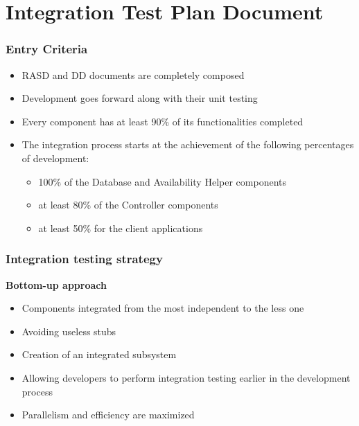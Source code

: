 \section{Integration Test Plan Document}

\begin{frame}
	\frametitle{Entry Criteria}
	\begin{itemize}
		\item RASD and DD documents are completely composed
		\item Development goes forward along with their unit testing
		\item Every component has at least 90\% of its functionalities completed
		\item The integration process starts at the achievement of the following percentages of development:
		\begin{itemize}
			\item 100\% of the Database and Availability Helper components
			\item at least 80\% of the Controller components
			\item at least 50\% for the client applications
		\end{itemize}
	\end{itemize}
\end{frame}

\begin{frame}
	\frametitle{Integration testing strategy}
	\qquad \textbf{Bottom-up approach}
	\begin{itemize}
		\item Components integrated from the most independent to the less one
		\item Avoiding useless stubs
		\item Creation of an integrated subsystem
		\item Allowing developers to perform integration testing earlier in the development process
		\item Parallelism and efficiency are maximized
	\end{itemize}
\end{frame}

